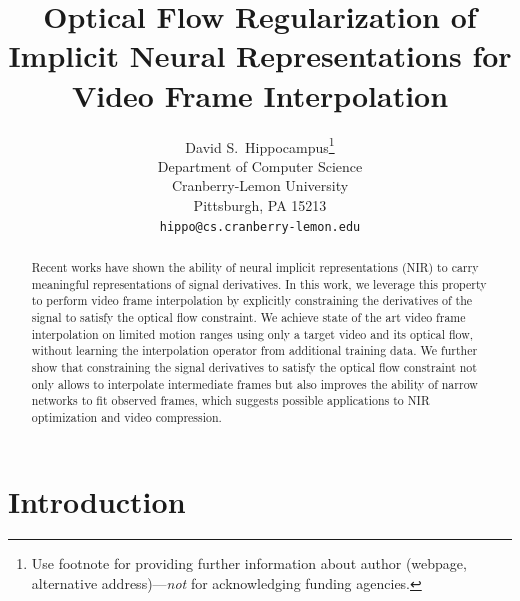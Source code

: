 \documentclass{article}
\title{Optical Flow Regularization of Implicit Neural Representations for Video Frame Interpolation}
\author{%
  David S.~Hippocampus\thanks{Use footnote for providing further information
    about author (webpage, alternative address)---\emph{not} for acknowledging
    funding agencies.} \\
  Department of Computer Science\\
  Cranberry-Lemon University\\
  Pittsburgh, PA 15213 \\
  \texttt{hippo@cs.cranberry-lemon.edu} \\
}
\begin{document}
\maketitle


\begin{abstract}
Recent works have shown the ability of neural implicit representations (NIR) to carry meaningful representations of signal derivatives.
In this work, we leverage this property to perform video frame interpolation
by explicitly constraining the derivatives of the signal to satisfy the optical flow constraint.
We achieve state of the art video frame interpolation on limited motion ranges
using only a target video and its optical flow, without learning the interpolation operator from additional training data.
We further show that constraining the signal derivatives to satisfy the optical flow constraint not only
allows to interpolate intermediate frames but also improves the ability of narrow networks to fit observed frames,
which suggests possible applications to NIR optimization and video compression.
\end{abstract}

\section{Introduction}

\end{document}
